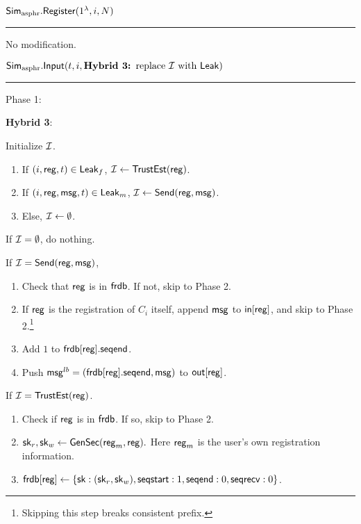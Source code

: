 
\vspace{10pt}

$\mathbf{\mathsf{Sim}_{\text{asphr}}.\mathsf{Register}}(1^{\lambda}, i, N)$
\vspace{5pt}
\hrule
\vspace{5pt}
No modification.
\vspace{10pt}

$\mathbf{\mathsf{Sim}_{\text{asphr}}.\mathsf{Input}}(t, i, { \textbf{Hybrid 3: } \text{replace $\mathcal{I}$ with $\mathsf{Leak}$}})$
\vspace{5pt}
\hrule
\vspace{5pt}
Phase 1: 

\begin{siderule}
{
 

\textbf{Hybrid 3}:

Initialize $\mathcal{I}$.

\begin{enumerate}
    \item If $(i, \mathsf{reg}, t) \in \mathsf{Leak}_f$, $\mathcal{I} \leftarrow \mathsf{TrustEst}(\mathsf{reg})$.
    \item If $(i, \mathsf{reg}, \mathsf{msg}, t) \in \mathsf{Leak}_m$, $\mathcal{I} \leftarrow \mathsf{Send}(\mathsf{reg}, \mathsf{msg})$.
    \item Else, $\mathcal{I} \leftarrow \emptyset$.
\end{enumerate}

}
\end{siderule}

If $\mathcal{I} = \emptyset$, do nothing. 

If $\mathcal{I} = \mathsf{Send}(\mathsf{reg}, \mathsf{msg})$, 

\begin{enumerate}
    \item Check that $\mathsf{reg}$ is in $\mathsf{frdb}$. If not, skip to Phase 2.
    \item If $\mathsf{reg}$ is the registration of $C_i$ itself, append $\mathsf{msg}$ to $\mathsf{in}[\mathsf{reg}]$, and skip to Phase 2.\footnote{Skipping this step breaks consistent prefix.}
    \item Add $1$ to $\mathsf{frdb}[\mathsf{reg}].\mathsf{seqend}$. 
    \item Push $\mathsf{msg}^{lb} = (\mathsf{frdb}[\mathsf{reg}].\mathsf{seqend}, \mathsf{msg})$ to $\mathsf{out}[\mathsf{reg}]$.
\end{enumerate}

If $\mathcal{I} = \mathsf{TrustEst}(\mathsf{reg})$.
\begin{enumerate}
    \item Check if $\mathsf{reg}$ is in $\mathsf{frdb}$. If so, skip to Phase 2.
    \item ${\mathsf{sk}}_r, {\mathsf{sk}}_w \leftarrow \mathsf{GenSec}(\mathsf{reg}_m, \mathsf{reg}).$ Here $\mathsf{reg}_m$ is the user's own registration information.
    \item $\mathsf{frdb}[\mathsf{reg}] \leftarrow \{{\mathsf{sk}}: ({\mathsf{sk}}_r, {\mathsf{sk}}_w),  \mathsf{seqstart}: 1, \mathsf{seqend}: 0, \quad \\ \mathsf{seqrecv}: 0\}$.
\end{enumerate}

